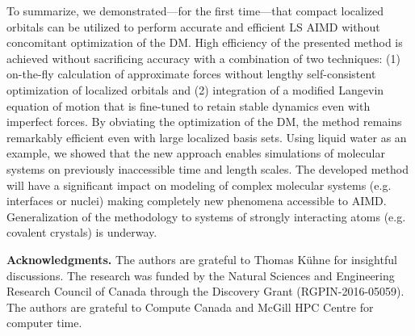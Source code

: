 \documentclass[aps,prl,reprint,amsmath,amssymb]{revtex4-1}
\begin{document}
To summarize, we demonstrated---for the first time---that compact localized orbitals can be utilized to perform accurate and efficient LS AIMD without concomitant optimization of the DM. %
High efficiency of the presented method is achieved without sacrificing accuracy with a combination of two techniques: (1) on-the-fly calculation of approximate forces without lengthy self-consistent optimization of localized orbitals and (2) integration of a modified Langevin equation of motion that is fine-tuned to retain stable dynamics even with imperfect forces. 
By obviating the optimization of the DM, the method remains remarkably efficient even with large localized basis sets. 
Using liquid water as an example, we showed that the new approach enables simulations of molecular systems on previously inaccessible time and length scales. 
The developed method will have a significant impact on modeling of complex molecular systems (e.g. interfaces or nuclei) making completely new phenomena accessible to AIMD. 
Generalization of the methodology to systems of strongly interacting atoms (e.g. covalent crystals) is underway.

\textbf{Acknowledgments.} The authors are grateful to Thomas K\"uhne for insightful discussions. The research was funded by the Natural Sciences and Engineering Research Council of Canada through the Discovery Grant (RGPIN-2016-05059). The authors are grateful to Compute Canada and McGill HPC Centre for computer time.

%


\else

%
\end{document}
